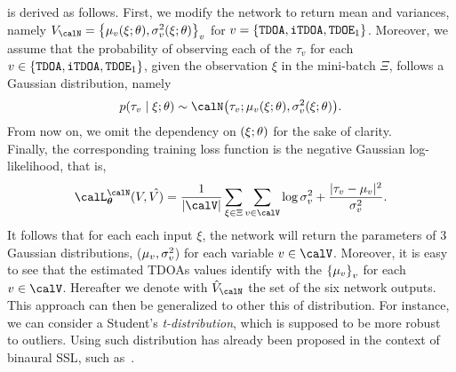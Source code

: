 is derived as follows. First, we modify the network to return mean and variances, namely
$V_{\calN} = \set{\muTauv, \sigmaTauv}_v$ for $v = \setTDOA$.
Moreover, we assume that the probability of observing each of the $\tau_v$ for each $v \in \setTDOA$, given the observation $\xi$ in the mini-batch $\Xi$, follows a Gaussian distribution, namely
\begin{equation}
    p(\tau_v \mid  \xi ; \theta) \sim \calN\kparen{\tau_v; \muTauv, \sigmaTauv}
    .
\end{equation}
From now on, we omit the dependency on $({\xi;\theta})$ for the sake of clarity.
\\Finally, the corresponding training loss function is the negative Gaussian log-likelihood, that is,
\begin{equation}\label{eq:lantern:gausslog}
    \calL_{\params}^{\calN}(V, \hat{V)} = \frac{1}{\kvbar{\calV}}
                                        \sum_{\xi\in\Xi} \sum_{v\in\calV}
                                                \log{\estSigmaTau}
                                                + \frac{\powerOf{\tau_v - \estMuTau}}{\estSigmaTau}
    .
\end{equation}
It follows that for each each input $\xi$, the network will return the parameters of 3 Gaussian distributions, ($\mu_{v}, \sigma^2_{v}$) for each variable $v\in\calV$.
Moreover, it is easy to see that the estimated \acp{TDOA} values identify with the $\set{\estMuTau}_v$ for each $v\in\calV$.
Hereafter we denote with $\hat{V}_{\calN}$ the set of the six network outputs.
\\This approach can then be generalized to other this of distribution.
For instance, we can consider a Student's \textit{t-distribution}, which is supposed to be more robust to outliers.
Using such distribution has already been proposed in the context of binaural \ac{SSL}, such as~.

